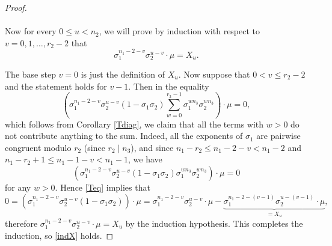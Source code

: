 \documentclass[12pt,a4paper]{article}
\theoremstyle{definition}
\newcommand{\uo}{\overline{r_2}}
\newcommand{\vo}{\overline{r_1}}
\begin{document}
\begin{proof}
\paragraph*{}



Now for every $0\leq u <n_2$, we will prove by induction with respect to $v=0,1,\dots,r_2-2$ that 
\begin{equation}\label{indX}
\sigma_1^{n_1-2-v}\sigma_2^{u-v}\cdot \mu =X_u.
\end{equation}

The base step $v=0$ is just the definition of $X_u$. Now suppose that $0<v\leq r_2-2$ and the statement holds for $v-1$. Then in the equality
\begin{equation}\label{Teq}
\left(\sigma_1^{n_1-2-v}\sigma_2^{u-v}(1-\sigma_1\sigma_2)\sum_{w=0}^{r_3-1}\sigma_1^{wn_3}\sigma_2^{wn_3}\right)\cdot \mu=0,
\end{equation}
which follows from Corollary \ref{Tdiag}, we claim that all the terms with $w>0$ do not contribute anything to the sum. Indeed, all the exponents of $\sigma_1$ are pairwise congruent modulo $r_2$ (since $r_2\mid n_3$), and since $n_1-r_2\leq n_1-2-v<n_1-2$ and $n_1-r_2+1\leq n_1-1-v<n_1-1$, we have $$\left(\sigma_1^{n_1-2-v}\sigma_2^{u-v}(1-\sigma_1\sigma_2)\sigma_1^{wn_3}\sigma_2^{wn_3}\right)\cdot \mu=0$$ for any $w>0$. Hence \eqref{Teq} implies that
$$0=\left(\sigma_1^{n_1-2-v}\sigma_2^{u-v}(1-\sigma_1\sigma_2)\right)\cdot \mu=\sigma_1^{n_1-2-v}\sigma_2^{u-v}\cdot \mu-\underbrace{\sigma_1^{n_1-2-(v-1)}\sigma_2^{u-(v-1)}\cdot \mu}_{=X_u},$$
therefore $\sigma_1^{n_1-2-v}\sigma_2^{u-v}\cdot \mu=X_u$ by the induction hypothesis. This completes the induction, so \eqref{indX} holds. %


\end{proof}
\end{document}
